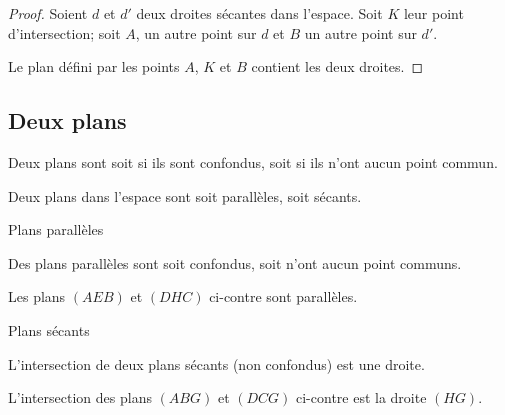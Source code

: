 \begin{proof}
    Soient \( d\) et \( d'\) deux droites sécantes dans l'espace. Soit \( K\) leur point d'intersection; soit \( A\), un autre point sur \( d\) et \( B\) un autre point sur \( d'\).

    Le plan défini par les points \( A\), \( K\) et \( B\) contient les deux droites.
\end{proof}

\subsection{Deux plans}

\begin{definition}
    Deux plans sont  soit si ils sont confondus, soit si ils n'ont aucun point commun.
\end{definition}


Deux plans dans l'espace sont soit parallèles, soit sécants.
\begin{multicols}{2}

    \begin{center}
        Plans parallèles
    \end{center}
    Des plans parallèles sont soit confondus, soit n'ont aucun point communs.

Les plans \( (AEB)\) et \( (DHC)\) ci-contre sont parallèles.

\columnbreak

    \begin{center}

    \end{center}


\end{multicols}

\begin{multicols}{2}
    \begin{center}
        Plans sécants
    \end{center}
    L'intersection de deux plans sécants (non confondus) est une droite.

    L'intersection des plans \( (ABG)\) et \( (DCG)\) ci-contre est la droite \( (HG)\).

    \columnbreak

    \begin{center}

    \end{center}

\end{multicols}

